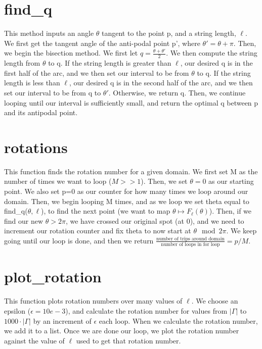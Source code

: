 \documentclass{article}
\begin{document}
\section*{find\_q}
This method inputs an angle $\theta$ tangent to the point p, and a string length, $\ell$. We first get the tangent angle of the anti-podal point p', where $\theta ' = \theta + \pi$. Then, we begin the bisection method. We first let $q=\frac{\theta+\theta'}{2}$. We then compute the string length from $\theta$ to q. If the string length is greater than $\ell$, our desired q is in the first half of the arc, and we then set our interval to be from $\theta$ to q. If the string length is less than $\ell$, our desired q is in the second half of the arc, and we then set our interval to be from q to $\theta'$. Otherwise, we return q. Then, we continue looping until our interval is sufficiently small, and return the optimal q between p and its antipodal point.

\section*{rotations}
This function finds the rotation number for a given domain. We first set M as the number of times we want to loop ($M>>1$). Then, we set $\theta = 0$ as our starting point. We also set p=0 as our counter for how many times we loop around our domain. Then, we begin looping M times, and as we loop we set theta equal to find\_q($\theta, \ell$), to find the next point (we want to map $\theta \mapsto F_\ell(\theta)$). Then, if we find our new $\theta>2\pi$, we have crossed our original spot (at 0), and we need to increment our rotation counter and fix theta to now start at $\theta \mod 2\pi$. We keep going until our loop is done, and then we return $\frac{\text{number of trips around domain}}{\text{number of loops in for loop}} = p/M$.

\section*{plot\_rotation}
This function plots rotation numbers over many values of $\ell$. We choose an epsilon ($\epsilon = 10e-3$), and calculate the rotation number for values from $|\Gamma|$ to $1000\cdot |\Gamma|$ by an increment of $\epsilon$ each loop. When we calculate the rotation number, we add it to a list. Once we are done our loop, we plot the rotation number against the value of $\ell$ used to get that rotation number. 
\end{document}
